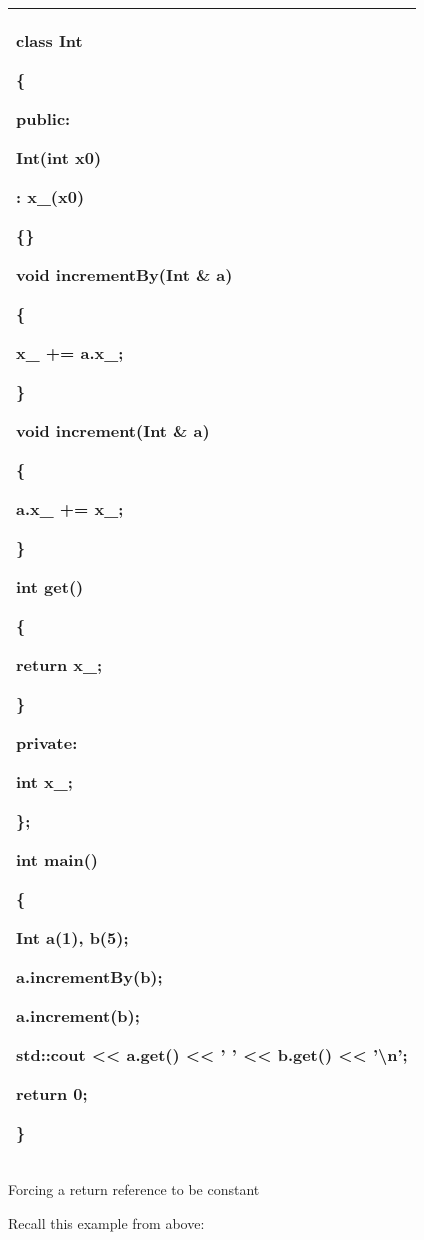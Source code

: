 \documentclass[
]{article}
\begin{document}
\begin{longtable}[]{@{}l@{}}
\toprule
\endhead
\begin{minipage}[t]{0.97\columnwidth}\raggedright
class Int

\{

public:

Int(int x0)

: x\_(x0)

\{\}

void incrementBy(Int \& a)

\{

x\_ += a.x\_;

\}

void increment(Int \& a)

\{

a.x\_ += x\_;

\}

int get()

\{

return x\_;

\}

private:

int x\_;

\};

int main()

\{

Int a(1), b(5);

a.incrementBy(b);

a.increment(b);

std::cout \textless\textless{} a.get() \textless\textless{} ' '
\textless\textless{} b.get() \textless\textless{} '\textbackslash n';

return 0;

\}\strut
\end{minipage}\tabularnewline
\bottomrule
\end{longtable}

Forcing a return reference to be constant

Recall this example from above:
\end{document}
